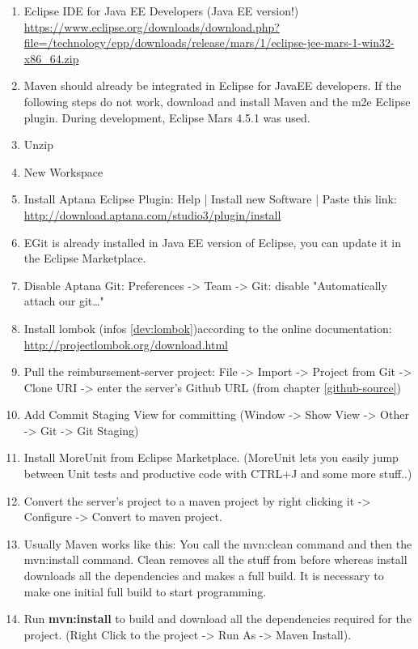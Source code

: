 \begin{enumerate}
	\item Eclipse IDE for Java EE Developers (Java EE version!) \newline
	\url{https://www.eclipse.org/downloads/download.php?file=/technology/epp/downloads/release/mars/1/eclipse-jee-mars-1-win32-x86_64.zip}
	\item Maven should already be integrated in Eclipse for JavaEE developers. If the following steps do not work, download and install Maven and the m2e Eclipse plugin. During development, Eclipse Mars 4.5.1 was used.
	\item Unzip
	\item New Workspace
	\item Install Aptana Eclipse Plugin: Help | Install new Software | Paste this link:
	\newline \url{http://download.aptana.com/studio3/plugin/install}
	\item EGit is already installed in Java EE version of Eclipse, you can update it in the Eclipse Marketplace.
	\item Disable Aptana Git: Preferences -> Team -> Git: disable "Automatically attach our git…"
	\item Install lombok (infos \ref{dev:lombok})according to the online documentation:\newline
	\url{http://projectlombok.org/download.html}
	\item Pull the reimbursement-server project: File -> Import -> Project from Git -> Clone URI -> enter the server's Github URL (from chapter \ref{github-source})
	\item Add Commit Staging View for committing (Window -> Show View -> Other -> Git -> Git Staging)
	\item Install MoreUnit from Eclipse Marketplace. (MoreUnit lets you easily jump between Unit tests and productive code with CTRL+J and some more stuff..)
	\item  Convert the server's project to a maven project by right clicking it -> Configure -> Convert to maven project.
	\item Usually Maven works like this: You call the mvn:clean command and then the mvn:install command. Clean removes all the stuff from before whereas install downloads all the dependencies and makes a full build. It is necessary to make one initial full build to start programming.
	\item Run \textbf{mvn:install} to build and download all the dependencies required for the project. (Right Click to the project -> Run As -> Maven Install).

\end{enumerate}
